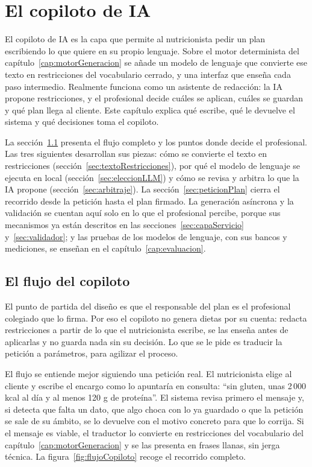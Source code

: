 \chapter{El copiloto de IA}
\label{cap:copilotoIA}

El copiloto de IA es la capa que permite al nutricionista pedir un plan escribiendo lo que quiere en su propio lenguaje. Sobre el motor determinista del capítulo~\ref{cap:motorGeneracion} se añade un modelo de lenguaje que convierte ese texto en restricciones del vocabulario cerrado, y una interfaz que enseña cada paso intermedio. Realmente funciona como un asistente de redacción: la IA propone restricciones, y el profesional decide cuáles se aplican, cuáles se guardan y qué plan llega al cliente. Este capítulo explica qué escribe, qué le devuelve el sistema y qué decisiones toma el copiloto.

La sección~\ref{sec:flujoCopiloto} presenta el flujo completo y los puntos donde decide el profesional. Las tres siguientes desarrollan sus piezas: cómo se convierte el texto en restricciones (sección~\ref{sec:textoRestricciones}), por qué el modelo de lenguaje se ejecuta en local (sección~\ref{sec:eleccionLLM}) y cómo se revisa y arbitra lo que la IA propone (sección~\ref{sec:arbitraje}). La sección~\ref{sec:peticionPlan} cierra el recorrido desde la petición hasta el plan firmado. La generación asíncrona y la validación se cuentan aquí solo en lo que el profesional percibe, porque sus mecanismos ya están descritos en las secciones~\ref{sec:capaServicio} y~\ref{sec:validador}; y las pruebas de los modelos de lenguaje, con sus bancos y mediciones, se enseñan en el capítulo~\ref{cap:evaluacion}.

\section{El flujo del copiloto}
\label{sec:flujoCopiloto}

El punto de partida del diseño es que el responsable del plan es el profesional colegiado que lo firma. Por eso el copiloto no genera dietas por su cuenta: redacta restricciones a partir de lo que el nutricionista escribe, se las enseña antes de aplicarlas y no guarda nada sin su decisión. Lo que se le pide es traducir la petición a parámetros, para agilizar el proceso.

El flujo se entiende mejor siguiendo una petición real. El nutricionista elige al cliente y escribe el encargo como lo apuntaría en consulta: ``sin gluten, unas 2\,000 kcal al día y al menos 120 g de proteína''. El sistema revisa primero el mensaje y, si detecta que falta un dato, que algo choca con lo ya guardado o que la petición se sale de su ámbito, se lo devuelve con el motivo concreto para que lo corrija. Si el mensaje es viable, el traductor lo convierte en restricciones del vocabulario del capítulo~\ref{cap:motorGeneracion} y se las presenta en frases llanas, sin jerga técnica. La figura~\ref{fig:flujoCopiloto} recoge el recorrido completo.

